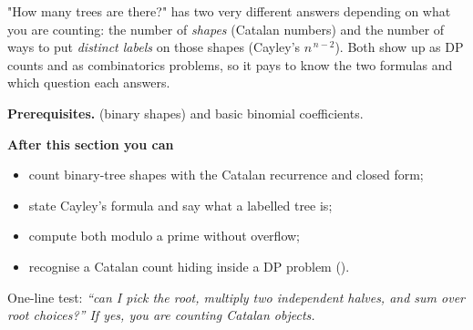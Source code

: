 \begin{topicintro}
"How many trees are there?" has two very different answers depending on what you are
counting: the number of \emph{shapes} (Catalan numbers) and the number of ways to put
\emph{distinct labels} on those shapes (Cayley's $n^{\,n-2}$). Both show up as DP counts and
as combinatorics problems, so it pays to know the two formulas and which question each answers.

\textbf{Prerequisites.}  (binary shapes) and basic binomial coefficients.

\textbf{After this section you can}
\begin{itemize}[nosep]
  \item count binary-tree shapes with the Catalan recurrence and closed form;
  \item state Cayley's formula and say what a labelled tree is;
  \item compute both modulo a prime without overflow;
  \item recognise a Catalan count hiding inside a DP problem ().
\end{itemize}
\end{topicintro}

\begin{recognitionbox}
One-line test: \emph{``can I pick the root, multiply two independent halves, and sum over
root choices?'' If yes, you are counting Catalan objects.}
\end{recognitionbox}


